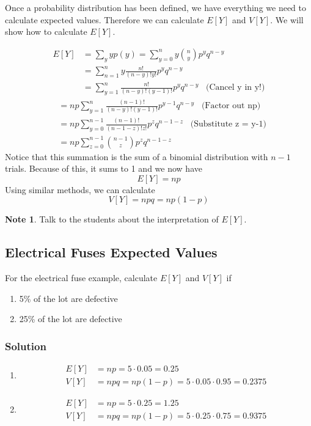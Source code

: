 \documentclass[11pt]{article}
\theoremstyle{definition}
\newtheorem{note}{Note}
\begin{document}
Once a probability distribution has been defined, we have everything we need to calculate expected values. Therefore we can calculate $E[Y]$ and $V[Y]$. We will show how to calculate $E[Y]$.

\begin{shaded}
	$$
		\begin{aligned}
			E[Y] & = \sum_y yp(y) = \sum_{y=0}^n y {n \choose y} p^y q^{n-y} \\
			& = \sum_{n=1}^n y \frac{n!}{(n-y)!y!} p^y q^{n-y} \\
			& = \sum_{y=1}^n \frac{n!}{(n-y)!(y-1)!} p^y q^{n-y} \;\;\; \text{(Cancel y in y!)}
		\end{aligned}
	$$
	$$
		\begin{aligned}
			& = np \sum_{y=1}^n \frac{(n-1)!}{(n-y)!(y-1)!} p^{y-1}q^{n-y} \;\;\; \text{(Factor out np)} \\
			& = np \sum_{y=0}^{n-1} \frac{(n-1)!}{(n-1-z)!z!} p^z q^{n-1-z} \;\;\; \text{(Substitute z = y-1)} \\
			& = np \sum_{z=0}^{n-1} {n-1 \choose z} p^z q^{n-1-z}
		\end{aligned}
	$$
	\newpage
	Notice that this summation is the sum of a binomial distribution with $n-1$ trials. Because of this, it sums to 1 and we now have
	$$
		E[Y] = np
	$$
	Using similar methods, we can calculate
	$$
		V[Y] = npq = np(1-p)
	$$
\end{shaded}

\begin{note}
	Talk to the students about the interpretation of $E[Y]$.
\end{note}

\subsection{Electrical Fuses Expected Values}

For the electrical fuse example, calculate $E[Y]$ and $V[Y]$ if

\begin{enumerate}[label=\alph*)]
	\item 5\% of the lot are defective
	\item 25\% of the lot are defective
\end{enumerate}

\subsubsection*{Solution}

\begin{enumerate}[label=\alph*)]
	\item
		$$
			\begin{aligned}
				E[Y] & = np = 5 \cdot 0.05 = 0.25 \\
				V[Y] & = npq = np(1-p) = 5 \cdot 0.05 \cdot 0.95 = 0.2375
			\end{aligned}
		$$
	\item
		$$
			\begin{aligned}
				E[Y] & = np = 5 \cdot 0.25 = 1.25 \\
				V[Y] & = npq = np(1-p) = 5 \cdot 0.25 \cdot 0.75 = 0.9375
			\end{aligned}
		$$
\end{enumerate}
\end{document}
